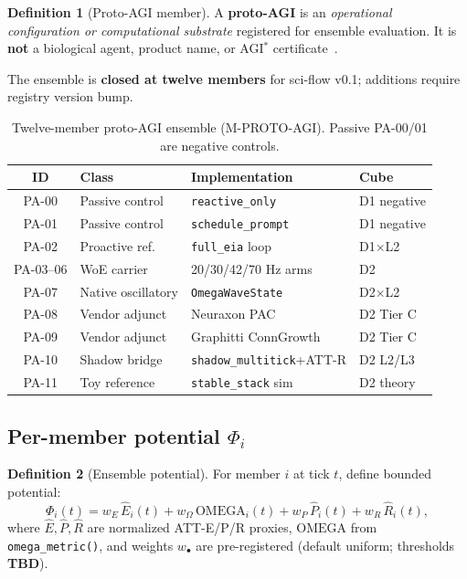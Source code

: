 \documentclass[11pt,a4paper]{article}
\theoremstyle{definition}
\newtheorem{definition}{Definition}
\begin{document}
\begin{definition}[Proto-AGI member]
A \textbf{proto-AGI} is an \emph{operational configuration or computational substrate} registered for ensemble evaluation. It is \textbf{not} a biological agent, product name, or AGI$^{*}$ certificate~\cite{kuznetsov2026proto}.
\end{definition}

The ensemble is \textbf{closed at twelve members} for sci-flow v0.1; additions require registry version bump.

\begin{table}[H]
\centering\small
\begin{tabular}{clp{4.2cm}p{2.2cm}}
\toprule ID & Class & Implementation & Cube \\ \midrule
PA-00 & Passive control & \texttt{reactive\_only} & D1 negative \\
PA-01 & Passive control & \texttt{schedule\_prompt} & D1 negative \\
PA-02 & Proactive ref. & \texttt{full\_eia} loop & D1$\times$L2 \\
PA-03--06 & WoE carrier & 20/30/42/70 Hz arms & D2 \\
PA-07 & Native oscillatory & \texttt{OmegaWaveState} & D2$\times$L2 \\
PA-08 & Vendor adjunct & Neuraxon PAC & D2 Tier C \\
PA-09 & Vendor adjunct & Graphitti ConnGrowth & D2 Tier C \\
PA-10 & Shadow bridge & \texttt{shadow\_multitick}+ATT-R & D2 L2/L3 \\
PA-11 & Toy reference & \texttt{stable\_stack} sim & D2 theory \\ \bottomrule
\end{tabular}
\caption{Twelve-member proto-AGI ensemble (M-PROTO-AGI). Passive PA-00/01 are negative controls.}
\label{tab:ensemble}
\end{table}

\subsection{Per-member potential $\Phi_i$}

\begin{definition}[Ensemble potential]
For member $i$ at tick $t$, define bounded potential:
\begin{equation}
\Phi_i(t) = w_E\, \hat{E}_i(t) + w_\Omega\, \mathrm{OMEGA}_i(t) + w_P\, \hat{P}_i(t) + w_R\, \hat{R}_i(t),
\end{equation}
where $\hat{E},\hat{P},\hat{R}$ are normalized ATT-E/P/R proxies, $\mathrm{OMEGA}$ from \texttt{omega\_metric()}, and weights $w_\bullet$ are pre-registered (default uniform; thresholds \textbf{TBD}).
\end{definition}
\end{document}
